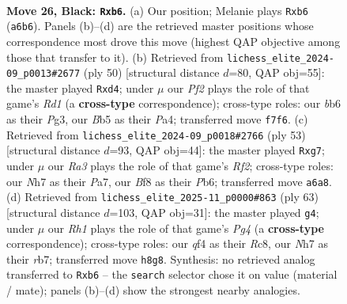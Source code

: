 \documentclass[11pt]{article}
\begin{document}
\clearpage

\begin{figure}[p]\centering
\begin{subfigure}{0.46\textwidth}\centering
\resizebox{\linewidth}{!}{%
\newchessgame
\chessboard[
  setfen={1k3b1r/1p2pp1n/rB1p2p1/1b6/3PPQ2/1P2RP2/6PP/1K5R b - - 5 26},
  showmover=false,
  pgfstyle=straightmove, color=movearrow, markmove={a6-b6}
]}
\caption{}
\end{subfigure}\hfill
\begin{subfigure}{0.46\textwidth}\centering
\resizebox{\linewidth}{!}{%
\newchessgame
\chessboard[
  setfen={4r1k1/r2pbp1p/p5p1/8/Pp1qB3/6P1/1P2PP1P/R2R2K1 w - - 0 26},
  showmover=false,
  pgfstyle=straightmove, color=movearrow, markmove={d1-d4}
]}
\caption{}
\end{subfigure}
\\[4pt]
\begin{subfigure}{0.46\textwidth}\centering
\resizebox{\linewidth}{!}{%
\newchessgame
\chessboard[
  setfen={6k1/p4rBp/1p2b3/5p2/4pQ1P/P7/1P1R1PPK/2r5 b - - 0 27},
  showmover=false,
  pgfstyle=straightmove, color=movearrow, markmove={f7-g7}
]}
\caption{}
\end{subfigure}\hfill
\begin{subfigure}{0.46\textwidth}\centering
\resizebox{\linewidth}{!}{%
\newchessgame
\chessboard[
  setfen={2r3k1/1R3p2/1RPB1b2/r5p1/p2p4/3P2P1/P1Q2PK1/4q3 b - - 3 32},
  showmover=false,
  pgfstyle=straightmove, color=movearrow, markmove={g5-g4}
]}
\caption{}
\end{subfigure}
\caption{\textbf{Move 26, Black: \texttt{Rxb6}.} (a) Our position; Melanie plays \texttt{Rxb6} (\texttt{a6b6}). Panels (b)--(d) are the retrieved master positions whose correspondence most drove this move (highest QAP objective among those that transfer to it). (b) Retrieved from \texttt{lichess\_elite\_2024-09\_p0013\#2677} (ply 50) [structural distance $d$=80, QAP obj=55]: the master played \texttt{Rxd4}; under $\mu$ our \emph{Pf2} plays the role of that game's \emph{Rd1} (a \textbf{cross-type} correspondence); cross-type roles: our \emph{b}b6 as their \emph{P}g3, our \emph{B}b5 as their \emph{P}a4; transferred move \texttt{f7f6}. (c) Retrieved from \texttt{lichess\_elite\_2024-09\_p0018\#2766} (ply 53) [structural distance $d$=93, QAP obj=44]: the master played \texttt{Rxg7}; under $\mu$ our \emph{Ra3} plays the role of that game's \emph{Rf2}; cross-type roles: our \emph{N}h7 as their \emph{P}a7, our \emph{B}f8 as their \emph{P}b6; transferred move \texttt{a6a8}. (d) Retrieved from \texttt{lichess\_elite\_2025-11\_p0000\#863} (ply 63) [structural distance $d$=103, QAP obj=31]: the master played \texttt{g4}; under $\mu$ our \emph{Rh1} plays the role of that game's \emph{Pg4} (a \textbf{cross-type} correspondence); cross-type roles: our \emph{q}f4 as their \emph{R}c8, our \emph{N}h7 as their \emph{r}b7; transferred move \texttt{h8g8}. Synthesis: no retrieved analog transferred to \texttt{Rxb6} -- the \texttt{search} selector chose it on value (material / mate); panels (b)--(d) show the strongest nearby analogies.}
\label{fig:thought-m51}
\end{figure}
\end{document}
